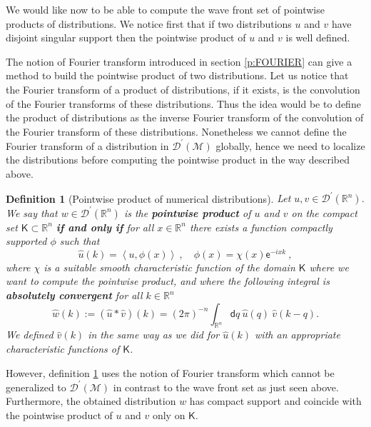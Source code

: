 \documentclass[11pt]{book}
\newcommand{\sm}[1]{\left\langle#1\right\rangle}
\newcommand{\Dcal}{\mathcal{D}}
\newcommand{\Mcal}{\mathcal{M}}
\newcommand{\Rbb}{\mathbb{R}}
\newcommand{\Ksf}{\mathsf{K}}
\newcommand{\dsf}{\mathsf{d}}
\newcommand{\esf}{\mathsf{e}}
\theoremstyle{break}
\newtheorem{definition}{Definition}[chapter]
\begin{document}
\bigskip


We would like now to be able to compute the wave front set of pointwise products of distributions. We notice first that if two distributions $u$ and $v$ have disjoint singular support then the pointwise product of $u$ and $v$ is well defined.


\bigskip


The notion of Fourier transform introduced in section \ref{p:FOURIER} can give a method to build the pointwise product of two distributions. Let us notice that the Fourier transform of a product of distributions, if it exists, is the convolution of the Fourier transforms of these distributions. Thus the idea would be to define the product of distributions as the inverse Fourier transform of the convolution of the Fourier transform of these distributions. Nonetheless we cannot define the Fourier transform of a distribution in $\Dcal^\prime(\Mcal)$ globally, hence we need to localize the distributions before computing the pointwise product in the way described above. 



\begin{definition}[Pointwise product of numerical distributions]\label{def:prod_distib_fourier} 
Let $u, v \in \Dcal^\prime(\Rbb^n)$. We say that $w\in\Dcal^\prime(\Rbb^n)$ is the \textbf{pointwise product} of $u$ and $v$ on the compact set $\Ksf \subset \Rbb^n$ \textbf{if and only if} for all $x \in \Rbb^n$ there exists a function compactly supported $\phi$ such that
%
\begin{equation*}
\widehat{u}(k) = \sm{u , \phi(x)} \ , \quad \phi(x) = \chi(x) \esf^{-ixk} \ ,
\end{equation*}
%
where $\chi$ is a suitable smooth characteristic function of the domain $\Ksf$ where we want to compute the pointwise product, and  where the following integral is \textbf{absolutely convergent} for all $k\in\Rbb^n$
%
\begin{equation*}
\widehat{w}(k) := \left(\widehat{u} \ast \widehat{v}\right)(k) = (2\pi)^{-n} \int_{\Rbb^n} \dsf q \ \widehat{u}(q) \ \widehat{v}(k-q) .
\end{equation*}
%
We defined $\widehat{v}(k)$ in the same way as we did for $\widehat{u}(k)$ with an appropriate characteristic functions of $\Ksf$.
\end{definition}


However, definition \ref{def:prod_distib_fourier} uses the notion of Fourier transform which cannot be generalized to $\Dcal^\prime(\Mcal)$ in contrast to the wave front set as just seen above. Furthermore, the obtained distribution $w$ has compact support and coincide with the pointwise product of $u$ and $v$ only on $\Ksf$.
\end{document}
